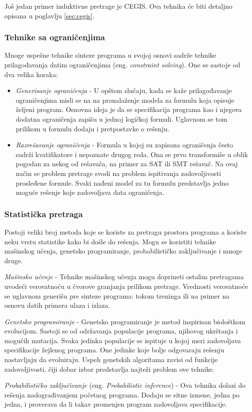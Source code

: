 Još jedan primer induktivne pretrage je CEGIS. Ova tehnika će biti detaljno opisana u poglavlju \ref{sec:cegis}.

\subsubsection{Tehnike sa ograničenjima}
\label{subsubsec:ConstraintSolving}

Mnoge uspešne tehnike sinteze programa u svojoj osnovi sadrže tehnike prilagođavanja datim ograničenjima (eng. \emph{constraint solving}). One se sastoje od dva velika koraka:
\begin{itemize}
  \item \emph{Generisanje ograničenja} - U opštem slučaju, kada se kaže prilagođavanje ograničenjima misli se na na pronalaženje modela za formulu koja opisuje željeni program. Osnovna ideja je da se specifikacija programa kao i njegova dodatna ograničenja zapišu u jednoj logičkoj formuli. Uglavnom se tom prilikom u formulu dodaju i pretpostavke o rešenju.
  \item \emph{Razrešavanje ograničenja} - Formula u kojoj su zapisana ograničenja često sadrži kvatifikatore i nepoznate drugog reda. Ona se prvo transformiše u oblik pogodan za nekog od rešavača, na primer za SAT ili SMT rešavač. Na ovaj način se problem pretrage svodi na problem ispitivanja zadovoljivosti prosleđene formule. Svaki nađeni model za tu formulu predstavlja jedno moguće rešenje koje zadovoljava data ograničenja.
\end{itemize}

\subsubsection{Statistička pretraga}
\label{subsubsec:Statistical}

Postoji veliki broj metoda koje se koriste za pretragu prostora programa a koriste neku vrstu statistike kako bi došle do rešenja. Mogu se koristiti tehnike mašinskog učenja, genetsko programiranje, probabilističko zaključivanje i mnoge druge.

\emph{Mašinsko učenje} - Tehnike mašinskog učenja mogu doprineti ostalim pretragama uvodeći verovatnoću u čvorove granjanja prilikom pretrage. Vrednosti verovatnoće se uglavnom generišu pre sinteze programa: tokom treninga ili na primer na osnovu datih primera ulaza i izlaza. 

\emph{Genetsko programiranje} - Genetsko programiranje je metod inspirisan biološtkom evolucijom. Sastoji se od održavanja populacije programa, njihovog ukrštanja i mogučih mutacija. Svaka jedinka populacije se ispituje u kojoj meri zadovoljava specifikacije žejlenog programa. One jedinke koje bolje odgovaraju rešenju nastavljaju da evoluiraju. Uspeh genetskih algoritama zavisi od funkcije zadovoljivosti, čiji dobar izbor predstavlja najteži problem ove tehnike.

\emph{Probabilističko zaključivanje} (eng. \emph{Probabilistic inference}) - Ova tehnika dolazi do rešenja nadograđivanjem početnog programa. Dodaju se sitne izmene, jedna po jedna, i proverava da li takav promenjen program zadovoljava specifikacije.
